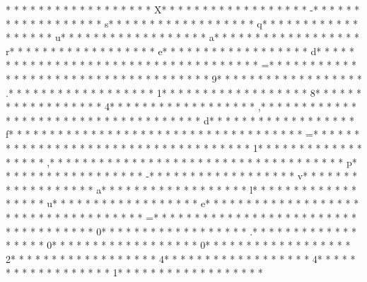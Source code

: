 * * *  * * *  * * *  *  * * *  *  * * *  * X* * *  * * *  * * *  *  * * *  *  * * *  * -* * *  * * *  * * *  *  * * *  *  * * *  * s* * *  * * *  * * *  *  * * *  *  * * *  * q* * *  * * *  * * *  *  * * *  *  * * *  * u* * *  * * *  * * *  *  * * *  *  * * *  * a* * *  * * *  * * *  *  * * *  *  * * *  * r* * *  * * *  * * *  *  * * *  *  * * *  * e* * *  * * *  * * *  *  * * *  *  * * *  * d* * *  * * *  * * *  *  * * *  *  * * *  *  * * *  * * *  * * *  *  * * *  *  * * *  * =* * *  * * *  * * *  *  * * *  *  * * *  *  * * *  * * *  * * *  *  * * *  *  * * *  * 9* * *  * * *  * * *  *  * * *  *  * * *  * .* * *  * * *  * * *  *  * * *  *  * * *  * 1* * *  * * *  * * *  *  * * *  *  * * *  * 8* * *  * * *  * * *  *  * * *  *  * * *  * 4* * *  * * *  * * *  *  * * *  *  * * *  * ,* * *  * * *  * * *  *  * * *  *  * * *  *  * * *  * * *  * * *  *  * * *  *  * * *  * d* * *  * * *  * * *  *  * * *  *  * * *  * f* * *  * * *  * * *  *  * * *  *  * * *  *  * * *  * * *  * * *  *  * * *  *  * * *  * =* * *  * * *  * * *  *  * * *  *  * * *  *  * * *  * * *  * * *  *  * * *  *  * * *  * 1* * *  * * *  * * *  *  * * *  *  * * *  * ,* * *  * * *  * * *  *  * * *  *  * * *  *  * * *  * * *  * * *  *  * * *  *  * * *  * p* * *  * * *  * * *  *  * * *  *  * * *  * -* * *  * * *  * * *  *  * * *  *  * * *  * v* * *  * * *  * * *  *  * * *  *  * * *  * a* * *  * * *  * * *  *  * * *  *  * * *  * l* * *  * * *  * * *  *  * * *  *  * * *  * u* * *  * * *  * * *  *  * * *  *  * * *  * e* * *  * * *  * * *  *  * * *  *  * * *  *  * * *  * * *  * * *  *  * * *  *  * * *  * =* * *  * * *  * * *  *  * * *  *  * * *  *  * * *  * * *  * * *  *  * * *  *  * * *  * 0* * *  * * *  * * *  *  * * *  *  * * *  * .* * *  * * *  * * *  *  * * *  *  * * *  * 0* * *  * * *  * * *  *  * * *  *  * * *  * 0* * *  * * *  * * *  *  * * *  *  * * *  * 2* * *  * * *  * * *  *  * * *  *  * * *  * 4* * *  * * *  * * *  *  * * *  *  * * *  * 4* * *  * * *  * * *  *  * * *  *  * * *  * 1* * *  * * *  * * *  *  * * *  *  * * *  * 
